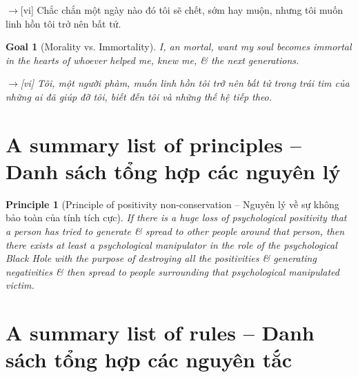 \documentclass[12pt,twoside]{book}
\newtheorem{goal}{Goal}
\newtheorem{principle}{Principle}
\begin{document}
{\sf[en]$\to$[vi]} Chắc chắn một ngày nào đó tôi sẽ chết, sớm hay muộn, nhưng tôi muốn linh hồn tôi trở nên bất tử.

\begin{goal}[Morality vs. Immortality]
	I, an mortal, want my soul becomes immortal in the hearts of whoever helped me, knew me, \& the next generations.
	
	{\sf[en]$\to$[vi]} Tôi, một người phàm, muốn linh hồn tôi trở nên bất tử trong trái tim của những ai đã giúp đỡ tôi, biết đến tôi và những thế hệ tiếp theo.
\end{goal}

\section{A summary list of principles -- Danh sách tổng hợp các nguyên lý}

\begin{principle}[Principle of positivity non-conservation -- Nguyên lý về sự không bảo toàn của tính tích cực]
	If there is a huge loss of psychological positivity that a person has tried to generate \& spread to other people around that person, then there exists at least a psychological manipulator in the role of the psychological Black Hole with the purpose of destroying all the positivities \& generating negativities \& then spread to people surrounding that psychological manipulated victim.
\end{principle}

\section{A summary list of rules -- Danh sách tổng hợp các nguyên tắc}
\end{document}
